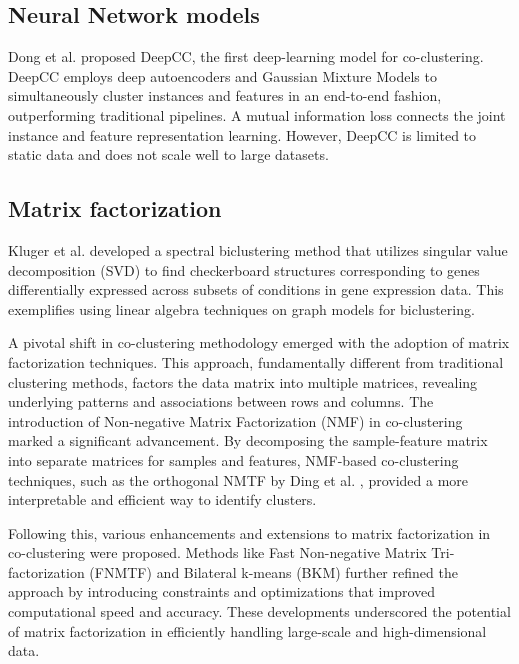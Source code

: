 \subsection{Neural Network models}
Dong et al.\cite{dongkuanxu2019DeepCoClustering} proposed DeepCC, the first deep-learning model for co-clustering. DeepCC employs deep autoencoders and Gaussian Mixture Models to simultaneously cluster instances and features in an end-to-end fashion, outperforming traditional pipelines. A mutual information loss connects the joint instance and feature representation learning. However, DeepCC is limited to static data and does not scale well to large datasets.

\subsection{Matrix factorization}
Kluger et al. \cite{kluger2003SpectralBiclusteringMicroarray} developed a spectral biclustering method that utilizes singular value decomposition (SVD) to find checkerboard structures corresponding to genes differentially expressed across subsets of conditions in gene expression data. This exemplifies using linear algebra techniques on graph models for biclustering.

A pivotal shift in co-clustering methodology emerged with the adoption of matrix factorization techniques. This approach, fundamentally different from traditional clustering methods, factors the data matrix into multiple matrices, revealing underlying patterns and associations between rows and columns. The introduction of Non-negative Matrix Factorization (NMF) in co-clustering marked a significant advancement. By decomposing the sample-feature matrix into separate matrices for samples and features, NMF-based co-clustering techniques, such as the orthogonal NMTF by Ding et al. \cite{ding2006OrthogonalNonnegativeMatrix}, provided a more interpretable and efficient way to identify clusters.

Following this, various enhancements and extensions to matrix factorization in co-clustering were proposed. Methods like Fast Non-negative Matrix Tri-factorization (FNMTF) \cite{wang2019DualHypergraphRegularized}and Bilateral k-means (BKM) \cite{junweihan2017BilateralKMeansAlgorithm} further refined the approach by introducing constraints and optimizations that improved computational speed and accuracy. These developments underscored the potential of matrix factorization in efficiently handling large-scale and high-dimensional data.

